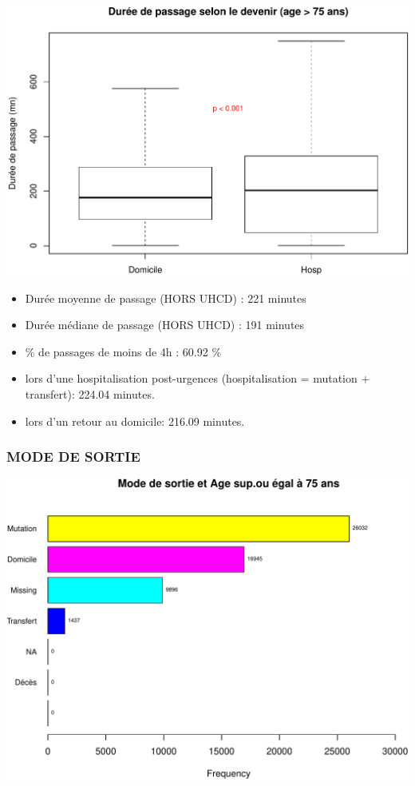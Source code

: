 \documentclass[]{article}
\begin{document}
\includegraphics{rapport2014_V4_files/figure-latex/duree_passage_75-1.pdf}

\begin{itemize}
\itemsep1pt\parskip0pt
\item
  Durée moyenne de passage (HORS UHCD) : 221 minutes
\item
  Durée médiane de passage (HORS UHCD) : 191 minutes
\item
  \% de passages de moins de 4h : 60.92 \%
\item
  lors d'une hospitalisation post-urgences (hospitalisation = mutation +
  transfert): 224.04 minutes.
\item
  lors d'un retour au domicile: 216.09 minutes.
\end{itemize}

\subsubsection{MODE DE SORTIE}\label{mode-de-sortie-1}

\includegraphics{rapport2014_V4_files/figure-latex/sortie75-1.pdf}
\end{document}
